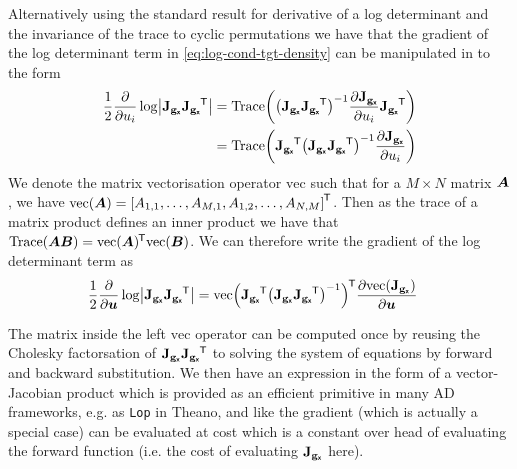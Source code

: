 Alternatively using the standard result for derivative of a log determinant and the invariance of the trace to cyclic permutations we have that the gradient of the log determinant term in \eqref{eq:log-cond-tgt-density} can be manipulated in to the form
\begin{align}
    \frac{1}{2} \pd{}{u_i} \log\left| 
      \jacobian{\genfunc_{\rvct{x}}}\jacobian{\genfunc_{\rvct{x}}}\phantom{}\tr
    \right| &=
    \trace\lpa
      \lpa \jacobian{\genfunc_{\rvct{x}}} \jacobian{\genfunc_{\rvct{x}}}\phantom{}\tr\rpa^{-1}
      \pd{\jacobian{\genfunc_{\rvct{x}}}}{u_i}
      \jacobian{\genfunc_{\rvct{x}}}\phantom{}\tr
    \rpa\\
    &=
    \trace\lpa
      \jacobian{\genfunc_{\rvct{x}}}\phantom{}\tr
      \lpa \jacobian{\genfunc_{\rvct{x}}} \jacobian{\genfunc_{\rvct{x}}}\phantom{}\tr\rpa^{-1}
      \pd{\jacobian{\genfunc_{\rvct{x}}}}{u_i}
    \rpa
\end{align}
We denote the matrix vectorisation operator $\textrm{vec}$ such that for a $M\times N$ matrix $\boldsymbol{A}$, we have $\textrm{vec}(\mtx{A}) = \lsb A_{1,1},\dots,A_{M,1}, A_{1,2},\dots,A_{N,M}\rsb\tr$. Then as the trace of a matrix product defines an inner product we have that $\operatorname{Trace}(\boldsymbol{A}\boldsymbol{B}) = \textrm{vec}(\boldsymbol{A})^{\mkern-1.5mu\mathsf{T}}\textrm{vec}(\boldsymbol{B})$. We can therefore write the gradient of the log determinant term as
\begin{align}
    \frac{1}{2} \pd{}{\vct{u}} \log\left| 
      \jacobian{\genfunc_{\rvct{x}}}\jacobian{\genfunc_{\rvct{x}}}\phantom{}\tr 
    \right| &=
    \textrm{vec}\lpa
      \jacobian{\genfunc_{\rvct{x}}}\phantom{}\tr
      \lpa \jacobian{\genfunc_{\rvct{x}}}\jacobian{\genfunc_{\rvct{x}}}\phantom{}\tr\rpa^{-1}
    \rpa\tr
    \pd{
    \textrm{vec}\lpa
      \jacobian{\genfunc_{\rvct{x}}}
    \rpa
    }
    {\vct{u}}
\end{align}

The matrix inside the left $\textrm{vec}$ operator can be computed once by reusing the Cholesky factorsation of $\mathbf{J}_{{\mathbf{g}}_{\boldsymbol{\mathsf{x}}}}\mathbf{J}_{{\mathbf{g}}_{\boldsymbol{\mathsf{x}}}}\phantom{}^{\mkern-1.5mu\mathsf{T}}$  to solving the system of equations by forward and backward substitution. We then have an expression in the form of a vector-Jacobian product which is provided as an efficient primitive in many \ac{AD} frameworks, e.g. as \texttt{Lop} in Theano, and like the gradient (which is actually a special case) can be evaluated at cost which is a constant over head of evaluating the forward function (i.e. the cost of evaluating $\mathbf{J}_{{\mathbf{g}}_{\boldsymbol{\mathsf{x}}}}$ here).

